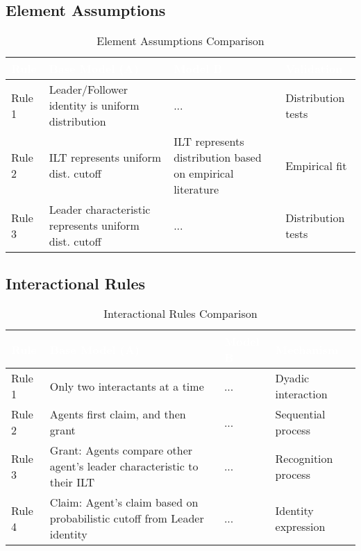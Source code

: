 \documentclass[12pt]{article}
\begin{document}
\subsection{Element Assumptions}
\begin{table}[H]
\begin{tabular}{L{3cm}|L{5cm}|L{5cm}|L{3cm}}
\textcolor{white}{\textbf{Rule}} & \textcolor{white}{\textbf{Base Model (A)}} & \textcolor{white}{\textbf{Model B}} & \textcolor{white}{\textbf{Validation}} \\
\hline
Rule 1 & Leader/Follower identity is uniform distribution & ... & Distribution tests \\
Rule 2 & ILT represents uniform dist. cutoff & ILT represents distribution based on empirical literature & Empirical fit \\
Rule 3 & Leader characteristic represents uniform dist. cutoff & ... & Distribution tests \\
\end{tabular}
\caption{Element Assumptions Comparison}
\end{table}

\subsection{Interactional Rules}
\begin{table}[H]
\begin{tabular}{L{3cm}|L{5cm}|L{5cm}|L{3cm}}
\textcolor{white}{\textbf{Rule}} & \textcolor{white}{\textbf{Base Model (A)}} & \textcolor{white}{\textbf{Model B}} & \textcolor{white}{\textbf{Mechanism}} \\
\hline
Rule 1 & Only two interactants at a time & ... & Dyadic interaction \\
Rule 2 & Agents first claim, and then grant & ... & Sequential process \\
Rule 3 & Grant: Agents compare other agent's leader characteristic to their ILT & ... & Recognition process \\
Rule 4 & Claim: Agent's claim based on probabilistic cutoff from Leader identity & ... & Identity expression \\
\end{tabular}
\caption{Interactional Rules Comparison}
\end{table}
\end{document}
